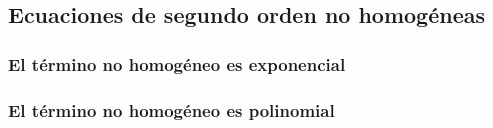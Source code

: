 \documentclass{article}
\begin{document}

\subsection{Ecuaciones de segundo orden no homogéneas}
\label{sec:nohomogeneas}


\subsubsection{El término no homogéneo es exponencial}
\label{sec:exponencial}


\subsubsection{El término no homogéneo es polinomial}
\label{sec:polinomial}

\end{document}
